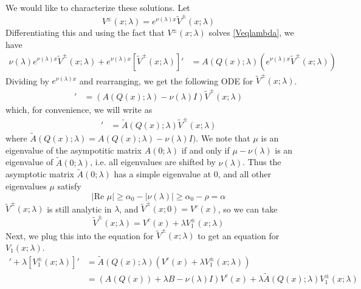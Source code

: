 \documentclass[thesis.tex]{subfiles}
\begin{document}
We would like to characterize these solutions. Let
\[
V^\pm(x; \lambda) = e^{\nu(\lambda)x}\tilde{V}^\pm(x; \lambda)
\]
Differentiating this and using the fact that $V^\pm(x; \lambda)$ solves \eqref{Veqlambda}, we have
\begin{align*}
\nu(\lambda) e^{\nu(\lambda)x}\tilde{V}^\pm(x; \lambda) 
+ e^{\nu(\lambda)x}[\tilde{V}^\pm(x; \lambda)]'
&= A(Q(x); \lambda) (e^{\nu(\lambda)x}\tilde{V}^\pm(x; \lambda))
\end{align*}
Dividing by $e^{\nu(\lambda)x}$ and rearranging, we get the following ODE for $\tilde{V}^\pm(x; \lambda)$.
\begin{align*}
[\tilde{V}^\pm(x; \lambda)]'
&= (A(Q(x); \lambda) - \nu(\lambda)I)\tilde{V}^\pm(x; \lambda)
\end{align*}
which, for convenience, we will write as
\begin{align*}
[\tilde{V}^\pm(x; \lambda)]'
&= \tilde{A}(Q(x); \lambda)\tilde{V}^\pm(x; \lambda)
\end{align*}
where $\tilde{A}(Q(x); \lambda) = A(Q(x); \lambda) - \nu(\lambda)I)$. We note that $\mu$ is an eigenvalue of the asympotitic matrix $A(0; \lambda)$ if and only if $\mu - \nu(\lambda)$ is an eigenvalue of $\tilde{A}(0; \lambda)$, i.e. all eigenvalues are shifted by $\nu(\lambda)$. Thus the asymptotic matrix $\tilde{A}(0; \lambda)$ has a simple eigenvalue at 0, and all other eigenvalues $\mu$ satisfy
\[
|\text{Re }\mu| \geq \alpha_0 - |\nu(\lambda)| \geq \alpha_0 - \rho = \alpha
\]
$\tilde{V}^\pm(x; \lambda)$ is still analytic in $\lambda$, and $\tilde{V}^\pm(x; 0) = V^c(x)$, so we can take 
\[
\tilde{V}^\pm(x; \lambda) = V^c(x) + \lambda V_1^\pm(x; \lambda)
\]
Next, we plug this into the equation for $\tilde{V}^\pm(x; \lambda)$ to get an equation for $V_1(x; \lambda)$.
\begin{align*}
[V^c(x)]' + \lambda [V_1^\pm(x; \lambda)]'
&= \tilde{A}(Q(x); \lambda)(V^c(x) + \lambda V_1^\pm(x; \lambda)) \\
&= (A(Q(x)) + \lambda B - \nu(\lambda)I)V^c(x) + \lambda \tilde{A}(Q(x); \lambda) V_1^\pm(x; \lambda) \\

\end{align*}
\end{document}
